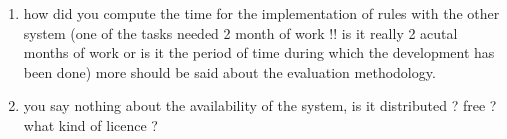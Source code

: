 \begin{enumerate}[leftmargin=0mm,label=\bfseries CommentR1.\arabic*]
\item \label{Review1.5} 
how did you compute the time for the implementation of rules 
with the other system (one of the tasks needed 2 month of work 
!! is it really 2 acutal months of work or is it the period of 
time during which the development has been done)
more should be said about the evaluation methodology.



\item \label{Review1.5}
you say nothing about the availability of the system, 
is it distributed ? free ? what kind of licence ?


\end{enumerate}
